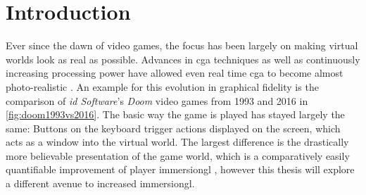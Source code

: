 
\chapter{Introduction}\label{chapter:Introduction}

Ever since the dawn of video games, the focus has been largely on making virtual worlds look as real as possible. Advances in \gls{cga} techniques as well as continuously increasing processing power have allowed even real time \gls{cga} to become almost photo-realistic \autocite{photorealismRealtime}.
\newline
An example for this evolution in graphical fidelity is the comparison of \textit{id Software}'s \textit{Doom} video games from 1993 and 2016 in \autoref{fig:doom1993vs2016}. The basic way the game is played has stayed largely the same: Buttons on the keyboard trigger actions displayed on the screen, which acts as a window into the virtual world. The largest difference is the drastically more believable presentation of the game world, which is a comparatively easily quantifiable improvement of player \gls{immersiongl} \autocite{gameImmersion}, however this thesis will explore a different avenue to increased \gls{immersiongl}.

